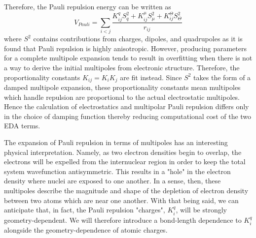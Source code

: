 \documentclass[journal=jctcce,manuscript=article]{achemso}
\begin{document}
Therefore, the Pauli repulsion energy can be written as
\begin{equation}
  V_{Pauli}=\sum_{i<j}\frac{K_{ij}^q S^2_{q}+K_{ij}^\mu S^2_{\mu}+K_{ij}^\Theta S^2_{\Theta}}{r_{ij}}
\label{eq:pauli}
\end{equation}
\noindent
where $S^2$ contains contributions from charges, dipoles, and quadrupoles as it is found that Pauli repulsion is highly anisotropic. However, producing parameters for a complete multipole expansion tends to result in overfitting when there is not a way to derive the initial multipoles from electronic structure. Therefore, the proportionality constants $K_{ij}=K_iK_j$ are fit instead. Since $S^2$ takes the form of a damped multipole expansion\cite{rackers2019classical}, these proportionality constants mean multipoles which handle repulsion are proportional to the actual electrostatic multipoles. Hence the calculation of electrostatics and multipolar Pauli repulsion differs only in the choice of damping function thereby reducing computational cost of the two EDA terms.

The expansion of Pauli repulsion in terms of multipoles has an interesting physical interpretation. Namely, as two electron densities begin to overlap, the electrons will be expelled from the internuclear region in order to keep the total system wavefunction antisymmetric. This results in a "hole" in the electron density where nuclei are exposed to one another. In a sense, then, these multipoles describe the magnitude and shape of the depletion of electron density between two atoms which are near one another. With that being said, we can anticipate that, in fact, the Pauli repulsion "charges", $K_i^q$, will be strongly geometry-dependent. We will therefore introduce a bond-length dependence to $K_i^q$ alongside the geometry-dependence of atomic charges.
\end{document}
